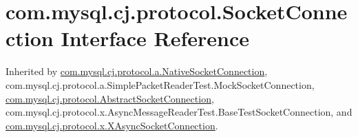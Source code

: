 \hypertarget{interfacecom_1_1mysql_1_1cj_1_1protocol_1_1_socket_connection}{}\section{com.\+mysql.\+cj.\+protocol.\+Socket\+Connection Interface Reference}
\label{interfacecom_1_1mysql_1_1cj_1_1protocol_1_1_socket_connection}


Inherited by \mbox{\hyperlink{classcom_1_1mysql_1_1cj_1_1protocol_1_1a_1_1_native_socket_connection}{com.\+mysql.\+cj.\+protocol.\+a.\+Native\+Socket\+Connection}}, com.\+mysql.\+cj.\+protocol.\+a.\+Simple\+Packet\+Reader\+Test.\+Mock\+Socket\+Connection, \mbox{\hyperlink{classcom_1_1mysql_1_1cj_1_1protocol_1_1_abstract_socket_connection}{com.\+mysql.\+cj.\+protocol.\+Abstract\+Socket\+Connection}}, com.\+mysql.\+cj.\+protocol.\+x.\+Async\+Message\+Reader\+Test.\+Base\+Test\+Socket\+Connection, and \mbox{\hyperlink{classcom_1_1mysql_1_1cj_1_1protocol_1_1x_1_1_x_async_socket_connection}{com.\+mysql.\+cj.\+protocol.\+x.\+X\+Async\+Socket\+Connection}}.

